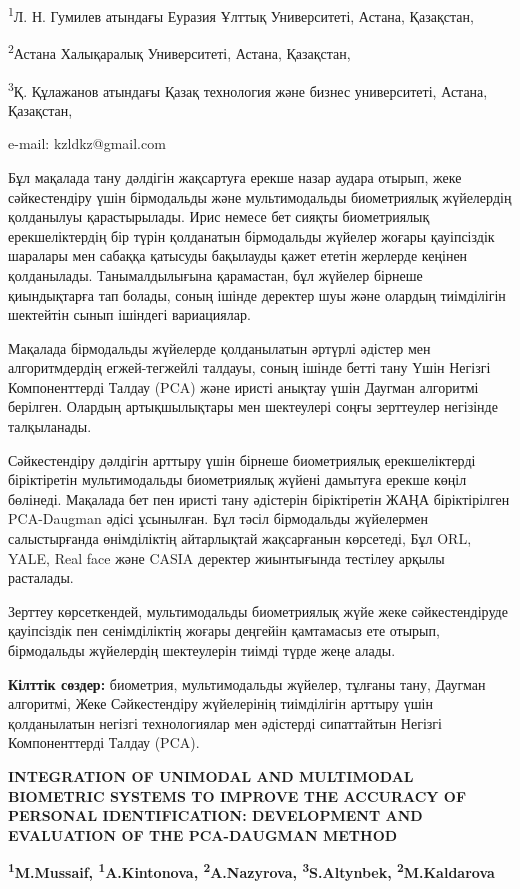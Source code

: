 \textsuperscript{1}Л. Н. Гумилев атындағы Еуразия Ұлттық Университеті,
Астана, Қазақстан,

\textsuperscript{2}Астана Халықаралық Университеті, Астана, Қазақстан,

\textsuperscript{3}Қ. Құлажанов атындағы Қазақ технология және бизнес
университеті, Астана, Қазақстан,

e-mail: kzldkz@gmail.com

Бұл мақалада тану дәлдігін жақсартуға ерекше назар аудара отырып, жеке
сәйкестендіру үшін бірмодальды және мультимодальды биометриялық
жүйелердің қолданылуы қарастырылады. Ирис немесе бет сияқты биометриялық
ерекшеліктердің бір түрін қолданатын бірмодальды жүйелер жоғары
қауіпсіздік шаралары мен сабаққа қатысуды бақылауды қажет ететін
жерлерде кеңінен қолданылады. Танымалдылығына қарамастан, бұл жүйелер
бірнеше қиындықтарға тап болады, соның ішінде деректер шуы және олардың
тиімділігін шектейтін сынып ішіндегі вариациялар.

Мақалада бірмодальды жүйелерде қолданылатын әртүрлі әдістер мен
алгоритмдердің егжей-тегжейлі талдауы, соның ішінде бетті тану Үшін
Негізгі Компоненттерді Талдау (PCA) және иристі анықтау үшін Даугман
алгоритмі берілген. Олардың артықшылықтары мен шектеулері соңғы
зерттеулер негізінде талқыланады.

Сәйкестендіру дәлдігін арттыру үшін бірнеше биометриялық ерекшеліктерді
біріктіретін мультимодальды биометриялық жүйені дамытуға ерекше көңіл
бөлінеді. Мақалада бет пен иристі тану әдістерін біріктіретін ЖАҢА
біріктірілген PCA-Daugman әдісі ұсынылған. Бұл тәсіл бірмодальды
жүйелермен салыстырғанда өнімділіктің айтарлықтай жақсарғанын көрсетеді,
Бұл ORL, YALE, Real face және CASIA деректер жиынтығында тестілеу арқылы
расталады.

Зерттеу көрсеткендей, мультимодальды биометриялық жүйе жеке
сәйкестендіруде қауіпсіздік пен сенімділіктің жоғары деңгейін қамтамасыз
ете отырып, бірмодальды жүйелердің шектеулерін тиімді түрде жеңе алады.

\textbf{Кілттік сөздер:} биометрия, мультимодальды жүйелер, тұлғаны
тану, Даугман алгоритмі, Жеке Сәйкестендіру жүйелерінің тиімділігін
арттыру үшін қолданылатын негізгі технологиялар мен әдістерді
сипаттайтын Негізгі Компоненттерді Талдау (PCA).

\textbf{INTEGRATION OF UNIMODAL AND MULTIMODAL BIOMETRIC SYSTEMS TO
IMPROVE THE ACCURACY OF PERSONAL IDENTIFICATION: DEVELOPMENT AND
EVALUATION OF THE PCA-DAUGMAN METHOD}

\textbf{\textsuperscript{1}M.Mussaif, \textsuperscript{1}A.Kintonova,
\textsuperscript{2}A.Nazyrova, \textsuperscript{3}S.Altynbek,
\textsuperscript{2}M.Kaldarova}

